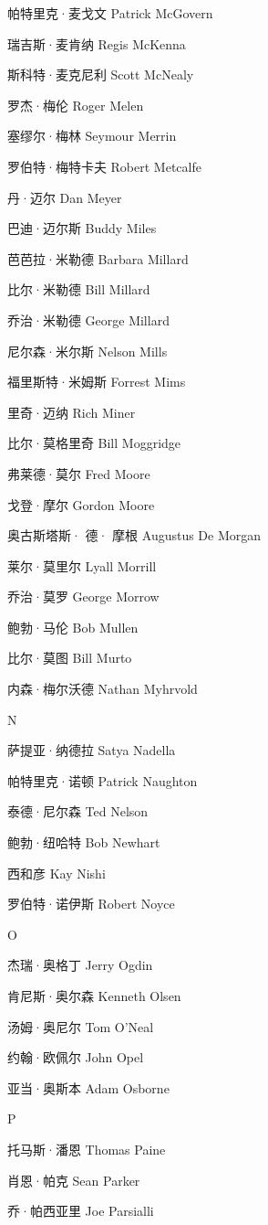 \documentclass[12pt,UTF8]{ctexbook}
\begin{document}
帕特里克·麦戈文 Patrick McGovern

瑞吉斯·麦肯纳 Regis McKenna

斯科特·麦克尼利 Scott McNealy

罗杰·梅伦 Roger Melen

塞缪尔·梅林 Seymour Merrin

罗伯特·梅特卡夫 Robert Metcalfe

丹·迈尔 Dan Meyer

巴迪·迈尔斯 Buddy Miles

芭芭拉·米勒德 Barbara Millard

比尔·米勒德 Bill Millard

乔治·米勒德 George Millard

尼尔森·米尔斯 Nelson Mills

福里斯特·米姆斯 Forrest Mims

里奇·迈纳 Rich Miner

比尔·莫格里奇 Bill Moggridge

弗莱德·莫尔 Fred Moore

戈登·摩尔 Gordon Moore

奥古斯塔斯· 德· 摩根 Augustus De Morgan

莱尔·莫里尔 Lyall Morrill

乔治·莫罗 George Morrow

鲍勃·马伦 Bob Mullen

比尔·莫图 Bill Murto

内森·梅尔沃德 Nathan Myhrvold

N

萨提亚·纳德拉 Satya Nadella

帕特里克·诺顿 Patrick Naughton

泰德·尼尔森 Ted Nelson

鲍勃·纽哈特 Bob Newhart

西和彦 Kay Nishi

罗伯特·诺伊斯 Robert Noyce

O

杰瑞·奥格丁 Jerry Ogdin

肯尼斯·奥尔森 Kenneth Olsen

汤姆·奥尼尔 Tom O’Neal

约翰·欧佩尔 John Opel

亚当·奥斯本 Adam Osborne

P

托马斯·潘恩 Thomas Paine

肖恩·帕克 Sean Parker

乔·帕西亚里 Joe Parsialli
\end{document}
